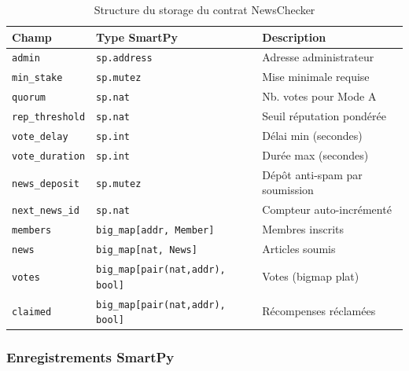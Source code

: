 \documentclass[12pt,a4paper]{article}
\begin{document}
\begin{table}[H]
\centering
\renewcommand{\arraystretch}{1.4}
\begin{tabular}{L{3.2cm} L{4.2cm} L{5cm}}
\toprule
{}
\textbf{Champ} & \textbf{Type SmartPy} & \textbf{Description} \\
\midrule
\texttt{admin}          & \texttt{sp.address}            & Adresse administrateur \\
\texttt{min\_stake}     & \texttt{sp.mutez}              & Mise minimale requise \\
\texttt{quorum}         & \texttt{sp.nat}                & Nb. votes pour Mode A \\
\texttt{rep\_threshold} & \texttt{sp.nat}                & Seuil réputation pondérée \\
\texttt{vote\_delay}    & \texttt{sp.int}                & Délai min (secondes) \\
\texttt{vote\_duration} & \texttt{sp.int}                & Durée max (secondes) \\
\texttt{news\_deposit}  & \texttt{sp.mutez}              & Dépôt anti-spam par soumission \\
\texttt{next\_news\_id} & \texttt{sp.nat}                & Compteur auto-incrémenté \\
\texttt{members}        & \texttt{big\_map[addr, Member]} & Membres inscrits \\
\texttt{news}           & \texttt{big\_map[nat, News]}   & Articles soumis \\
\texttt{votes}          & \texttt{big\_map[pair(nat,addr), bool]} & Votes (bigmap plat) \\
\texttt{claimed}        & \texttt{big\_map[pair(nat,addr), bool]} & Récompenses réclamées \\
\bottomrule
\end{tabular}
\caption{Structure du storage du contrat NewsChecker}
\end{table}

\subsubsection{Enregistrements SmartPy}
\end{document}
